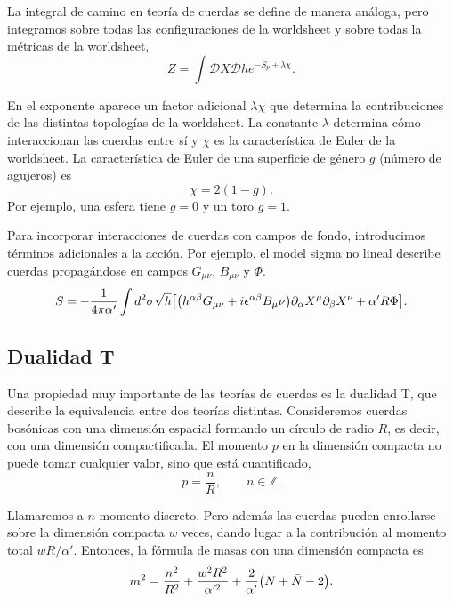 La integral de camino en teoría de cuerdas se define de manera análoga, pero integramos 
sobre todas las configuraciones  de la worldsheet y sobre todas la métricas de la worldsheet,
\begin{equation}
  Z = \int \mathcal DX \mathcal Dh e^{-S_p+\lambda \chi}.
\end{equation}

En el exponente aparece un factor adicional $\lambda\chi$ que determina la
contribuciones de las distintas topologías de la worldsheet.
La constante $\lambda$ determina cómo interaccionan las cuerdas entre sí y $\chi$ es la característica
de Euler de la worldsheet.
La característica de Euler de una superficie de género $g$ (número de agujeros) es
\begin{equation}
  \chi = 2(1-g).
\end{equation}
Por ejemplo, una esfera tiene $g=0$ y un toro $g=1$.

Para incorporar interacciones de cuerdas con campos de fondo, introducimos términos adicionales a la acción.
Por ejemplo, el model sigma no lineal describe cuerdas propagándose en campos $G_{\mu\nu}$, $B_{\mu\nu}$ y $\Phi$.
\begin{equation}
  S = -\frac{1}{4\pi \alpha'}\int d^2 \sigma \sqrt h \qty[\qty(h^{\alpha\beta}G_{\mu\nu} + i\epsilon^{\alpha\beta}B_\mu\nu)\partial_\alpha X^\mu
  \partial_\beta X^\nu +\alpha'R\Phi].
\end{equation}

\subsection{Dualidad T}
\label{sec:dual}
Una propiedad muy importante de las teorías de cuerdas es la dualidad T,
que describe la equivalencia entre dos teorías distintas.
Consideremos cuerdas bosónicas con una dimensión espacial formando un círculo de radio $R$,
es decir, con una dimensión compactificada.
El momento $p$ en la dimensión compacta no puede tomar cualquier valor, sino que está cuantificado,
\begin{equation}
  p = \frac{n}{R}, \qquad n \in \mathbb Z.
\end{equation}

Llamaremos a $n$ momento discreto.
Pero además las cuerdas pueden enrollarse sobre la dimensión compacta $w$ veces, dando lugar
a la contribución al momento total $wR/\alpha'$.
Entonces, la fórmula de masas con una dimensión compacta es
\begin{equation}
  m^2 = \frac{n^2}{R^2} + \frac{w^2 R^2}{\alpha'^2} +\frac{2}{\alpha'}\qty(N+\bar N -2).
\end{equation}

